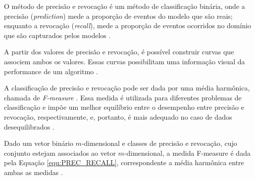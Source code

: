 \begin{document}
O método de precisão e revocação é um método de classificação binária, onde a precisão (\textit{prediction}) mede a proporção de eventos do modelo que são reais; enquanto a revocação (\textit{recall}), mede a proporção de eventos ocorridos no domínio que são capturados pelos modelos \cite{PREC_RECALL_REGR}. %

A partir dos valores de precisão e revocação, é possível construir curvas que associem ambos os valores. Essas curvas possibilitam uma informação visual da performance de um algoritmo \cite{PRECISION_RECALL}. 

A classificação de precisão e revocação pode ser dada por uma média harmônica, chamada de \textit{F-measure} \cite{F_MEASURE}. Essa medida é utilizada para diferentes problemas de classificação e impõe um melhor equilíbrio entre o desempenho entre precisão e revocação, respectivamente, e, portanto, é mais adequado no caso de dados desequilibrados \cite{F_MEASURE}. 

Dado um vetor binário $m$-dimensional e classes de precisão e revocação, cujo conjunto estejam associados ao vetor $m$-dimensional, a medida F-measure é dada pela Equação \ref{equ:PREC_RECALL}, correspondente a média harmônica entre ambas as medidas \cite{F_MEASURE}.
\end{document}
